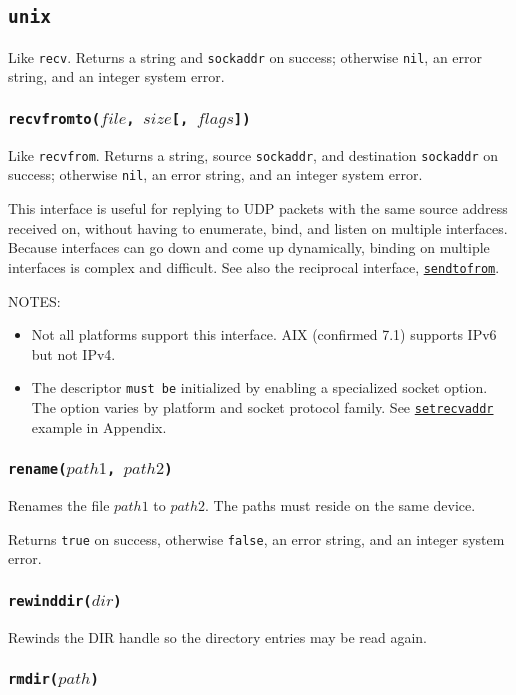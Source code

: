 \documentclass[11pt, oneside]{memoir}
\newcommand*{\true}[0]{\texttt{true}\xspace}
\newcommand*{\false}[0]{\texttt{false}\xspace}
\newcommand*{\nil}[0]{\texttt{nil}\xspace}
\newcommand*{\syscall}[1]{\texttt{#1}\xspace}
\newcommand*{\fn}[1]{\texttt{#1}\xspace}
\newcommand*{\otherwise}[1]{otherwise #1, an error string, and an integer system error}
\newcommand*{\sockaddr}[0]{\texttt{sockaddr}\xspace}
\newcommand*{\mustbe}[0]{\texttt{must be}\xspace}
\newcommand*{\seefn}[1]{\hyperref[#1]{\fn{#1}}\xspace}
\newcounter{toccols}
\newenvironment{Module}[1]{
	\subsection{\texttt{#1}}
	\addtocontents{toc}{
		\protect\begin{multicols}{\value{toccols}}
	}
}{
	\addtocontents{toc}{\protect\end{multicols}}
}
\begin{document}
\begin{Module}{unix}
Like \syscall{recv}. Returns a string and \sockaddr on success; \otherwise{\nil}.

\subsubsection[\fn{recvfromto}]{\fn{recvfromto($file$, $size$[, $flags$])}}

\label{recvfromto}

Like \syscall{recvfrom}. Returns a string, source \sockaddr, and destination \sockaddr on success; \otherwise{\nil}.

This interface is useful for replying to UDP packets with the same source address received on, without having to enumerate, bind, and listen on multiple interfaces. Because interfaces can go down and come up dynamically, binding on multiple interfaces is complex and difficult. See also the reciprocal interface, \seefn{sendtofrom}.

NOTES:
\begin{itemize}
\item Not all platforms support this interface. AIX (confirmed 7.1) supports IPv6 but not IPv4.
\item The descriptor \mustbe initialized by enabling a specialized socket option. The option varies by platform and socket protocol family. See \seefn{setrecvaddr} example in Appendix.
\end{itemize}

\subsubsection[\fn{rename}]{\fn{rename($path1$, $path2$)}}

Renames the file $path1$ to $path2$. The paths must reside on the same device.

Returns \true on success, otherwise \false, an error string, and an integer system error.

\subsubsection[\fn{rewinddir}]{\fn{rewinddir($dir$)}}

Rewinds the DIR handle so the directory entries may be read again.

\subsubsection[\fn{rmdir}]{\fn{rmdir($path$)}}


\end{Module}
\end{document}
